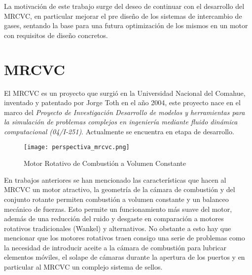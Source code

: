 La motivación de este trabajo surge del deseo de continuar con el desarrollo
del MRCVC, en particular mejorar el pre diseño de los sistemas de intercambio
de gases, sentando la base para una futura optimización de los mismos en un
motor con requisitos de diseño concretos.

\section{MRCVC}
%
El MRCVC es un proyecto que surgió en la Universidad Nacional del Comahue,
inventado y patentado por Jorge Toth\cite{toth} en el año 2004, este proyecto
nace en el marco del \emph{Proyecto de Investigación Desarrollo de modelos y
herramientas para la simulación de problemas complejos en ingeniería mediante
fluido dinámica computacional (04/I-251)}. Actualmente se encuentra en etapa de
desarrollo.

\begin{figure}
    \centering
    \texttt{[image: perspectiva\_mrcvc.png]}
    \caption{Motor Rotativo de Combustión a Volumen Constante}
    \label{fig:mrcvc}
\end{figure}

En trabajos anteriores\cite{lopez16, lopez13, roldan} se han mencionado las
características que hacen al MRCVC un motor atractivo, la geometría de la
cámara de combustión y del conjunto rotante permiten  combustión a volumen
constante y un balanceo mecánico de fuerzas.
%
Esto permite un funcionamiento más suave del motor, además de una reducción del
ruido y desgaste en comparación a motores rotativos tradicionales (Wankel) y
alternativos.
%
No obstante a esto hay que mencionar que los motores rotativos traen consigo
una serie de problemas como la necesidad de introducir aceite a la cámara de
combustión para lubricar elementos móviles, el solape de cámaras durante la
apertura de los puertos y en particular al MRCVC un complejo sistema de
sellos\cite{roldan}.


